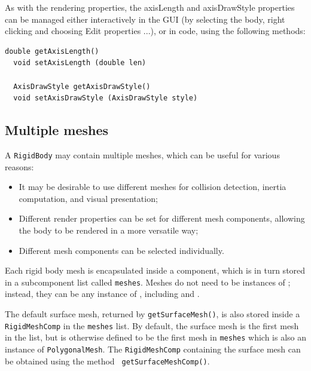 As with the rendering properties, the {\sf axisLength} and {\sf
axisDrawStyle} properties can be managed either interactively in the
GUI (by selecting the body, right clicking and choosing {\sf Edit
properties ...}), or in code, using the following methods:
\begin{lstlisting}[]
  double getAxisLength()
  void setAxisLength (double len)

  AxisDrawStyle getAxisDrawStyle()
  void setAxisDrawStyle (AxisDrawStyle style)
\end{lstlisting}
%

\subsection{Multiple meshes}
\label{rigidBodyMultipleMeshes:sec}

A {\tt RigidBody} may contain multiple meshes, which can be useful for
various reasons:

\begin{itemize}

\item It may be desirable to use different meshes for collision
detection, inertia computation, and visual presentation;

\item Different render properties can be set for different mesh
components, allowing the body to be rendered in a more versatile way;

\item Different mesh components can be selected individually.

\end{itemize}

Each rigid body mesh is encapsulated inside a
 component, which is in turn stored in
a subcomponent list called {\tt meshes}. Meshes do not need to be
instances of ; instead,
they can be any instance of ,
including  and
.

\begin{sideblock}
The default surface mesh, returned by {\tt getSurfaceMesh()}, is also
stored inside a {\tt RigidMeshComp} in the {\tt meshes} list. By
default, the surface mesh is the first mesh in the list, but is
otherwise defined to be the first mesh in {\tt meshes} which is also
an instance of {\tt PolygonalMesh}. The {\tt RigidMeshComp} containing
the surface mesh can be obtained using the method {\tt
getSurfaceMeshComp()}.
\end{sideblock}

